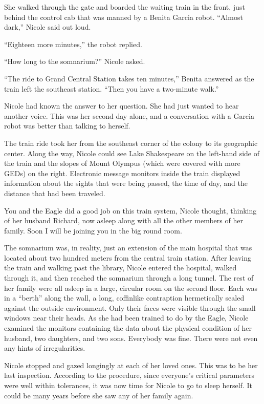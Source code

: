 \documentclass[]{article}
\begin{document}
{She walked through the gate and boarded the waiting train in the front, just behind the control cab that was manned by a Benita Garcia robot. “Almost dark,” Nicole said out loud.

“Eighteen more minutes,” the robot replied.

“How long to the somnarium?” Nicole asked.

“The ride to Grand Central Station takes ten minutes,” Benita answered as the train left the southeast station. “Then you have a two-minute walk.”

Nicole had known the answer to her question. She had just wanted to hear another voice. This was her second day alone, and a conversation with a Garcia robot was better than talking to herself.

The train ride took her from the southeast corner of the colony to its geographic center. Along the way, Nicole could see Lake Shakespeare on the left-hand side of the train and the slopes of Mount Olympus (which were covered with more GEDs) on the right. Electronic message monitors inside the train displayed information about the sights that were being passed, the time of day, and the distance that had been traveled.

You and the Eagle did a good job on this train system, Nicole thought, thinking of her husband Richard, now asleep along with all the other members of her family. Soon I will be joining you in the big round room.

The somnarium was, in reality, just an extension of the main hospital that was located about two hundred meters from the central train station. After leaving the train and walking past the library, Nicole entered the hospital, walked through it, and then reached the somnarium through a long tunnel. The rest of her family were all asleep in a large, circular room on the second floor. Each was in a “berth” along the wall, a long, coffinlike contraption hermetically sealed against the outside environment. Only their faces were visible through the small windows near their heads. As she had been trained to do by the Eagle, Nicole examined the monitors containing the data about the physical condition of her husband, two daughters, and two sons. Everybody was fine. There were not even any hints of irregularities.

Nicole stopped and gazed longingly at each of her loved ones. This was to be her last inspection. According to the procedure, since everyone’s critical parameters were well within tolerances, it was now time for Nicole to go to sleep herself. It could be many years before she saw any of her family again.

}
\end{document}
